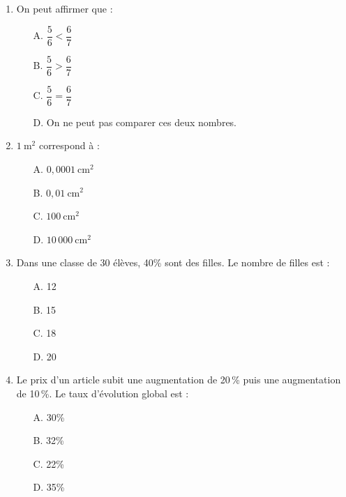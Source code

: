 \documentclass[a4paper, 12pt]{article}
\newcommand{\reponse}{\par\vspace{0.5cm}
\framebox[\linewidth]{\begin{minipage}{\dimexpr\linewidth-2\fboxsep}
\vspace{2.5cm}\hspace{0.5cm}
\end{minipage}}\vspace{0.5cm}
}
\begin{document}
\begin{enumerate}[label=\textbf{Question \arabic*}, leftmargin=*]

\item On peut affirmer que :
\begin{itemize}[label=$\square$]
\item[A.] $\dfrac{5}{6} < \dfrac{6}{7}$
\item[B.] $\dfrac{5}{6} > \dfrac{6}{7}$
\item[C.] $\dfrac{5}{6} = \dfrac{6}{7}$
\item[D.] On ne peut pas comparer ces deux nombres.
\end{itemize}
\reponse

\item $1\ \text{m}^2$ correspond à :
\begin{itemize}[label=$\square$]
\item[A.] $0,0001\ \text{cm}^2$
\item[B.] $0,01\ \text{cm}^2$
\item[C.] $100\ \text{cm}^2$
\item[D.] $10\,000\ \text{cm}^2$
\end{itemize}
\reponse

\item Dans une classe de 30 élèves, 40\% sont des filles. Le nombre de filles est :
\begin{itemize}[label=$\square$]
\item[A.] 12
\item[B.] 15
\item[C.] 18
\item[D.] 20
\end{itemize}
\reponse

\item Le prix d’un article subit une augmentation de 20\,\% puis une augmentation de 10\,\%. Le taux d’évolution global est :
\begin{itemize}[label=$\square$]
\item[A.] 30\%
\item[B.] 32\%
\item[C.] 22\%
\item[D.] 35\%
\end{itemize}
\reponse


\end{enumerate}
\end{document}
